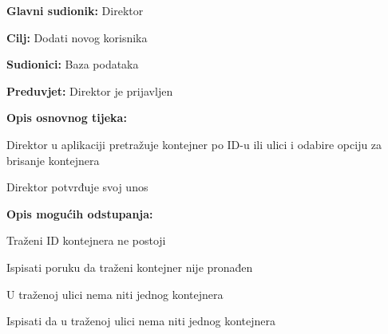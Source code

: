 			\noindent {}
			\begin{packed_item}
				
				\item \textbf{Glavni sudionik: } Direktor
				\item  \textbf{Cilj:} Dodati novog korisnika
				\item  \textbf{Sudionici:} Baza podataka
				\item  \textbf{Preduvjet:} Direktor je prijavljen
				\item  \textbf{Opis osnovnog tijeka:}
				
				\item[] \begin{packed_enum}
					
					\item Direktor u aplikaciji pretražuje kontejner po ID-u ili ulici i odabire opciju za brisanje kontejnera
					\item Direktor potvrđuje svoj unos
				\end{packed_enum}
				
				\item  \textbf{Opis mogućih odstupanja:}
				
				\item[] \begin{packed_item}
					
					\item[2.a] Traženi ID kontejnera ne postoji
					\item[] \begin{packed_enum}
						
						\item Ispisati poruku da traženi kontejner nije pronađen
						
					\end{packed_enum}
					\item[2.b] U traženoj ulici nema niti jednog kontejnera
					\item[] \begin{packed_enum}
						
						\item Ispisati da u traženoj ulici nema niti jednog kontejnera
						
					\end{packed_enum}
					
				\end{packed_item}
			\end{packed_item}
			
